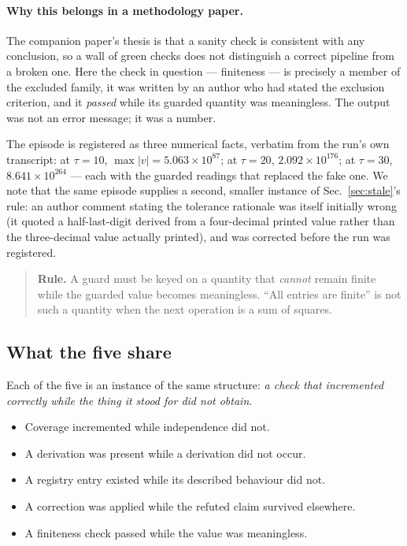 \documentclass[11pt,a4paper]{article}
\begin{document}
\paragraph{Why this belongs in a methodology paper.} The companion paper's
thesis is that a sanity check is consistent with any conclusion, so a wall of
green checks does not distinguish a correct pipeline from a broken one. Here the
check in question --- finiteness --- is precisely a member of the excluded
family, it was written by an author who had stated the exclusion criterion, and
it \emph{passed} while its guarded quantity was meaningless. The output was not
an error message; it was a number.

The episode is registered as three numerical facts, verbatim from the run's own
transcript: at $\tau{=}10$, $\max|v| = 5.063\times10^{87}$; at $\tau{=}20$,
$2.092\times10^{176}$; at $\tau{=}30$, $8.641\times10^{264}$ --- each with the
guarded readings that replaced the fake one. We note that the same episode
supplies a second, smaller instance of Sec.~\ref{sec:stale}'s rule: an author
comment stating the tolerance rationale was itself initially wrong (it quoted a
half-last-digit derived from a four-decimal printed value rather than the
three-decimal value actually printed), and was corrected before the run was
registered.

\begin{quote}\small
\textbf{Rule.} A guard must be keyed on a quantity that \emph{cannot} remain
finite while the guarded value becomes meaningless. ``All entries are finite''
is not such a quantity when the next operation is a sum of squares.
\end{quote}

\subsection{What the five share}
\label{sec:commontheme}

Each of the five is an instance of the same structure: \emph{a check that
incremented correctly while the thing it stood for did not obtain}.

\begin{itemize}[leftmargin=1.4em,itemsep=2pt]
  \item Coverage incremented while independence did not.
  \item A derivation was present while a derivation did not occur.
  \item A registry entry existed while its described behaviour did not.
  \item A correction was applied while the refuted claim survived elsewhere.
  \item A finiteness check passed while the value was meaningless.
\end{itemize}
\end{document}
